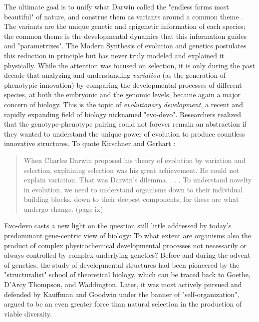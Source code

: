   The ultimate goal is to unify what Darwin called the "endless forms most beautiful" of nature, and construe them as variants around a common theme \cite{Carroll:2006ui}. The variants are the unique genetic and epigenetic information of each species; the common theme is the developmental dynamics that this information guides and "parametrizes". The Modern Synthesis of evolution and genetics postulates this reduction in principle but has never truly modeled and explained it physically. While the attention was focused on selection, it is only during the past decade that analyzing and understanding \textit{variation} (as the generation of phenotypic innovation) by comparing the developmental processes of different species, at both the embryonic and the genomic levels, became again a major concern of biology. This is the topic of \textit{evolutionary development}, a recent and rapidly expanding field of biology nicknamed "evo-devo". Researchers realized that the genotype-phenotype pairing could not forever remain an abstraction if they wanted to understand the unique power of evolution to produce countless innovative structures. To quote Kirschner and Gerhart \cite{Kirschner:2005us}: 
\begin{quotation}  When Charles Darwin proposed his theory of evolution by variation and selection, explaining selection was his great achievement. He could not explain variation. That was Darwin’s dilemma. . .  . To understand novelty in evolution, we need to understand organisms down to their individual building blocks, down to their deepest components, for these are what undergo change. (page ix) 
\end{quotation}

  Evo-devo casts a new light on the question still little addressed by today's predominant gene-centric view of biology: To what extent are organisms also the product of complex physicochemical developmental processes not necessarily or always controlled by complex underlying genetics? Before and during the advent of genetics, the study of developmental structures had been pioneered by the "structuralist" school of theoretical biology, which can be traced back to Goethe, D’Arcy Thompson, and Waddington. Later, it was most actively pursued and defended by Kauffman \cite{Kauffman:1993uj} and Goodwin \cite{Goodwin:1994tl} under the banner of "self-organization", argued to be an even greater force than natural selection in the production of viable diversity. 

